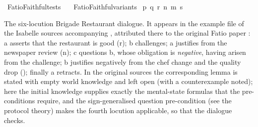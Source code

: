 %
\begin{isabellebody}%
%
%
\isadelimdocument
%
\endisadelimdocument
%
\isatagdocument
%
\isamarkuptrue%
%
\endisatagdocument
{\isafolddocument}%
%
\isadelimdocument
%
\endisadelimdocument
%
\isadelimtheory
%
\endisadelimtheory
%
\isatagtheory
{}\isamarkupfalse%
\ FatioFaithful{\isacharunderscore}{\kern0pt}tests\isanewline
\ \ \ FatioFaithful{\isacharunderscore}{\kern0pt}variants\isanewline
{}\isanewline
\isanewline
%
%
\endisatagtheory
{\isafoldtheory}%
%
\isadelimtheory
\isanewline
%
\endisadelimtheory
{}\isamarkupfalse%
\ p{\isacharcolon}{\kern0pt}{\isacharcolon}{\kern0pt}{\isasymS}\ q{\isacharcolon}{\kern0pt}{\isacharcolon}{\kern0pt}{\isasymS}\ r{\isacharcolon}{\kern0pt}{\isacharcolon}{\kern0pt}{\isasymS}\ n{\isacharcolon}{\kern0pt}{\isacharcolon}{\kern0pt}{\isasymS}\ m{\isacharcolon}{\kern0pt}{\isacharcolon}{\kern0pt}{\isasymS}\ s{\isacharcolon}{\kern0pt}{\isacharcolon}{\kern0pt}{\isasymS}%
\isadelimdocument
%
\endisadelimdocument
%
\isatagdocument
%
\isamarkuptrue%
%
\endisatagdocument
{\isafolddocument}%
%
\isadelimdocument
%
\endisadelimdocument
%
\begin{isamarkuptext}%
The six-locution Brigade Restaurant dialogue. It appears in the example file
of the Isabelle sources accompanying \cite{PasettoBenzmueller2024}, attributed
there to the original Fatio paper \cite{McBurneyParsons2005}: a asserts that the
restaurant is good (r); b challenges; a justifies from the newspaper review (n);
c questions b, whose obligation is \emph{negative}, having arisen from the challenge; b
justifies negatively from the chef change and the quality drop (); finally a
retracts. In the original sources the corresponding lemma is stated with empty
world knowledge and left open (with a counterexample noted); here the initial
knowledge  supplies exactly the mental-state formulas that the pre-conditions
require, and the sign-generalised question pre-condition (see the protocol theory)
makes the fourth locution applicable, so that the dialogue checks.%
\end{isamarkuptext}\isamarkuptrue%
\isamarkupfalse%

\end{isabellebody}
